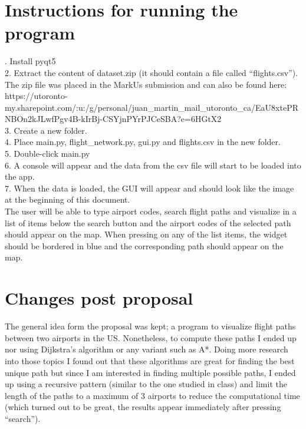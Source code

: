 \documentclass[fontsize=11pt]{article}
\begin{document}
\section*{Instructions for running the program}

.	Install pyqt5\\
2.	Extract the content of dataset.zip (it should contain a file called “flights.csv”).\\
The zip file was placed in the MarkUs submission and can also be found here:\\
https://utoronto-my.sharepoint.com/:u:/g/personal/juan\_martin\_mail\_utoronto\_ca/EaU8xtePRNBOn2kJLwfPgv4B-kIrBj-CSYjnPYrPJCeSBA?e=6HGtX2\\
3.	Create a new folder.\\
4.	Place main.py, flight\_network.py, gui.py and flights.csv in the new folder.\\
5.	Double-click main.py\\
6.	A console will appear and the data from the csv file will start to be loaded into the app.\\
7.	When the data is loaded, the GUI will appear and should look like the image at the beginning of this document.\\

\noindent
The user will be able to type airport codes, search flight paths and visualize in a list of items below the search button and the airport codes of the selected path should appear on the map. When pressing on any of the list items, the widget should be bordered in blue and the corresponding path should appear on the map.


\section*{Changes post proposal}

\noindent
The general idea form the proposal was kept; a program to visualize flight paths between two airports in the US. Nonetheless, to compute these paths I ended up nor using Dijkstra’s algorithm or any variant such as A*. Doing more research into those topics I found out that these algorithms are great for finding the best unique path but since I am interested in finding multiple possible paths, I ended up using a recursive pattern (similar to the one studied in class) and limit the length of the paths to a maximum of 3 airports to reduce the computational time (which turned out to be great, the results appear immediately after pressing “search”).
\end{document}
